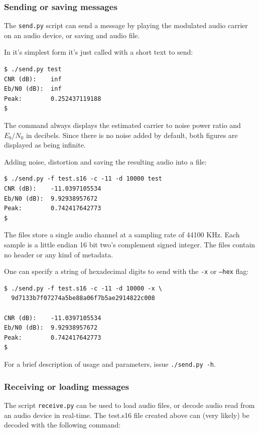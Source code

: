 \documentclass[a4paper]{article}
\begin{document}
\subsubsection{Sending or saving messages}

The \texttt{send.py} script can send a message by playing the modulated
audio carrier on an audio device, or saving and audio file.

In it's simplest form it's just called with a short text to send:

\begin{lstlisting}
$ ./send.py test
CNR (dB):    inf
Eb/N0 (dB):  inf
Peak:        0.252437119188
$
\end{lstlisting}

The command always displays the estimated carrier to noise power ratio 
and $E_b/N_0$ in decibels. Since there is no noise added by default, 
both figures are displayed as being infinite.

Adding noise, distortion and saving the resulting audio into a file:

\begin{lstlisting}
$ ./send.py -f test.s16 -c -11 -d 10000 test
CNR (dB):    -11.0397105534
Eb/N0 (dB):  9.92938957672
Peak:        0.742417642773
$
\end{lstlisting}

The files store a single audio channel at a sampling rate of 44100 KHz. 
Each sample is a little endian 16 bit two's complement signed integer. 
The files contain no header or any kind of metadata.

One can specify a string of hexadecimal digits to send with the 
\texttt{-x} or \texttt{--hex} flag:

\begin{lstlisting}
$ ./send.py -f test.s16 -c -11 -d 10000 -x \
  9d7133b7f07274a5be88a06f7b5ae2914822c008

CNR (dB):    -11.0397105534
Eb/N0 (dB):  9.92938957672
Peak:        0.742417642773
$
\end{lstlisting}

For a brief description of usage and parameters, issue 
\texttt{./send.py -h}.

\subsubsection{Receiving or loading messages}

The script \texttt{receive.py} can be used to load audio files, or 
decode audio read from an audio device in real-time. The test.s16 file 
created above can (very likely) be decoded with the following 
command:
\end{document}
